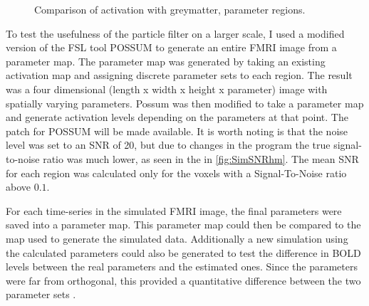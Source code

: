 \begin{figure}
\caption{Comparison of activation with greymatter, parameter regions.}
\label{fig:simslice_hm}
\end{figure}

To test the usefulness of the particle filter on a larger scale, I used a modified version
of the FSL tool
POSSUM to generate an entire FMRI image from a parameter map. The parameter map was generated
by taking an existing activation map and assigning discrete parameter sets to each region.
The result was a four dimensional (length x width
x height x parameter) image with spatially varying parameters. Possum was then modified
to take a parameter map and generate activation levels depending on the parameters at that
point. The patch for POSSUM will be made available. It is worth noting is that the noise
level was set to an SNR of 20, but due to changes
in the program the true signal-to-noise ratio was much lower, as seen in the
in \autoref{fig:SimSNRhm}. The mean SNR for each region was calculated only for the
voxels with a Signal-To-Noise ratio above $0.1$.

For each time-series in the simulated FMRI image, the final parameters were saved
into a parameter map. This parameter map could then be compared to the map used to generate the
simulated data. Additionally a new simulation using the calculated parameters could also be
generated to test the difference in BOLD levels between the real parameters and the
estimated ones. Since the parameters were far from orthogonal,
 this provided a quantitative difference between the two parameter sets \cite{Deneux2006}.

